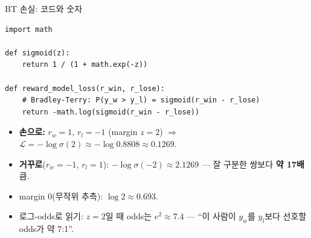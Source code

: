 \begin{frame}[fragile]{BT 손실: 코드와 숫자}
\begin{lstlisting}
import math

def sigmoid(z):
    return 1 / (1 + math.exp(-z))

def reward_model_loss(r_win, r_lose):
    # Bradley-Terry: P(y_w > y_l) = sigmoid(r_win - r_lose)
    return -math.log(sigmoid(r_win - r_lose))
\end{lstlisting}
  \small
  \begin{itemize}
    \item \textbf{손으로:} $r_w = 1$, $r_l = -1$ (margin
      $z = 2$) $\Rightarrow$ $\mathcal{L} = -\log\sigma(2)
      \approx -\log 0.8808 \approx \mathbf{0.1269}$.
    \item \textbf{거꾸로}($r_w = -1$, $r_l = 1$):
      $-\log\sigma(-2) \approx \mathbf{2.1269}$ — 잘
      구분한 쌍보다 \textbf{약 17배} 큼.
    \item margin 0(무작위 추측): $\log 2 \approx 0.693$.
    \item 로그-odds로 읽기: $z = 2$일 때 odds는 $e^2
      \approx 7.4$ — ``이 사람이 $y_w$를 $y_l$보다
      선호할 odds가 약 7:1''.
  \end{itemize}
\end{frame}
